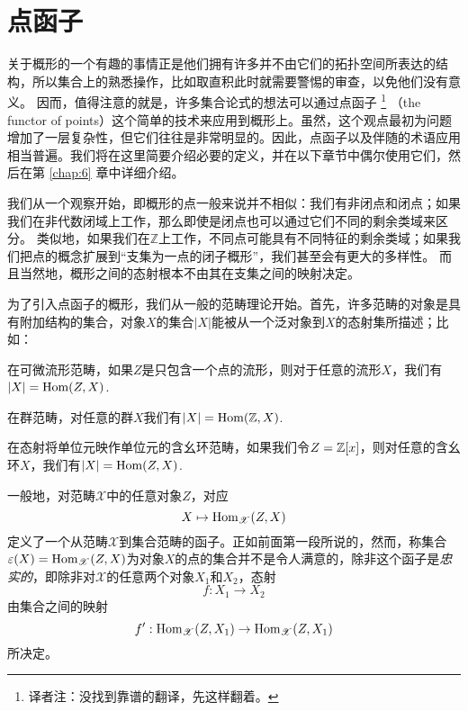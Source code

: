 \section{点函子}

关于概形的一个有趣的事情正是他们拥有许多并不由它们的拓扑空间所表达的结构，所以集合上的熟悉操作，比如取直积此时就需要警惕的审查，以免他们没有意义。 因而，值得注意的就是，许多集合论式的想法可以通过点函子
\footnote{译者注：没找到靠谱的翻译，先这样翻着。}
（the functor of points）这个简单的技术来应用到概形上。虽然，这个观点最初为问题增加了一层复杂性，但它们往往是非常明显的。因此，点函子以及伴随的术语应用相当普遍。我们将在这里简要介绍必要的定义，并在以下章节中偶尔使用它们，然后在第 \ref{chap:6} 章中详细介绍。

我们从一个观察开始，即概形的点一般来说并不相似：我们有非闭点和闭点；如果我们在非代数闭域上工作，那么即使是闭点也可以通过它们不同的剩余类域来区分。 类似地，如果我们在$\mathbb{Z}$上工作，不同点可能具有不同特征的剩余类域；如果我们把点的概念扩展到“支集为一点的闭子概形”，我们甚至会有更大的多样性。 而且当然地，概形之间的态射根本不由其在支集之间的映射决定。


为了引入点函子的概形，我们从一般的范畴理论开始。首先，许多范畴的对象是具有附加结构的集合，对象$X$的集合$|X|$能被从一个泛对象到$X$的态射集所描述；比如：
\begin{compactenum}[(a)]
\item 在可微流形范畴，如果$Z$是只包含一个点的流形，则对于任意的流形$X$，我们有$|X|=\operatorname{Hom}(Z,X)$.
\item 在群范畴，对任意的群$X$我们有$|X|=\operatorname{Hom}(\mathbb{Z},X)$.
\item 在态射将单位元映作单位元的含幺环范畴，如果我们令$Z=\mathbb{Z}[x]$，则对任意的含幺环$X$，我们有$|X|=\operatorname{Hom}(Z,X)$.
\end{compactenum}

一般地，对范畴$\mathscr{X}$中的任意对象$Z$，对应
\[
	X\mapsto \operatorname{Hom}_{\mathscr{X}}(Z,X)
\]
定义了一个从范畴$\mathscr{X}$到集合范畴的函子。正如前面第一段所说的，然而，称集合$\varepsilon(X)= \operatorname{Hom}_{\mathscr{X}}(Z,X)$为对象$X$的点的集合并不是令人满意的，除非这个函子是\textit{忠实的}，即除非对$\mathscr X$的任意两个对象$X_1$和$X_2$，态射
\[
	f:X_1\to X_2
\]
由集合之间的映射
\[
	f':\operatorname{Hom}_{\mathscr{X}}(Z,X_1)\to \operatorname{Hom}_{\mathscr{X}}(Z,X_1)
\]
所决定。

